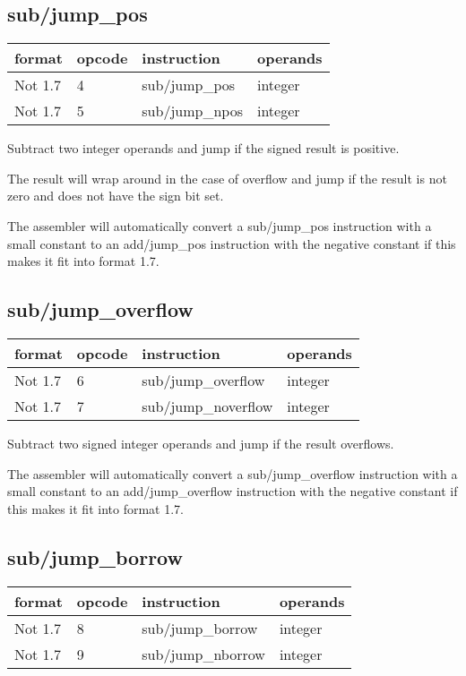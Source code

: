 \documentclass[forwardcom.tex]{subfiles}
\begin{document}
\subsection{sub/jump\_pos}
\label{table:subJumpPosInstruction}
\begin{tabular}{|p{20mm}|p{12mm}|p{56mm}|p{50mm}|}
\hline
\bfseries format & \bfseries opcode & \bfseries instruction & \bfseries operands \\ \hline
Not 1.7 &  4 & sub/jump\_pos & integer \\ \hline
Not 1.7 &  5 & sub/jump\_npos & integer\\ \hline
\end{tabular}
\vv

Subtract two integer operands and jump if the signed result is positive.

The result will wrap around in the case of overflow and jump if the result is not zero and does not have the sign bit set.
\vv

The assembler will automatically convert a sub/jump\_pos instruction with a small constant to an add/jump\_pos instruction with the negative constant if this makes it fit into format 1.7.
\vv

\subsection{sub/jump\_overflow}
\label{table:subJumpOverflInstruction}
\begin{tabular}{|p{20mm}|p{12mm}|p{56mm}|p{50mm}|}
\hline
\bfseries format & \bfseries opcode & \bfseries instruction & \bfseries operands \\ \hline
Not 1.7 &  6 & sub/jump\_overflow & integer \\ \hline
Not 1.7 &  7 & sub/jump\_noverflow & integer\\ \hline
\end{tabular}
\vv

Subtract two signed integer operands and jump if the result overflows.
\vv

The assembler will automatically convert a sub/jump\_overflow instruction with a small constant to an add/jump\_overflow instruction with the negative constant if this makes it fit into format 1.7.
\vv

\subsection{sub/jump\_borrow}
\label{table:subJumpBorrowInstruction}
\begin{tabular}{|p{20mm}|p{12mm}|p{56mm}|p{50mm}|}
\hline
\bfseries format & \bfseries opcode & \bfseries instruction & \bfseries operands \\ \hline
Not 1.7 &  8 & sub/jump\_borrow & integer \\ \hline
Not 1.7 &  9 & sub/jump\_nborrow & integer\\ \hline
\end{tabular}
\vv
\end{document}
